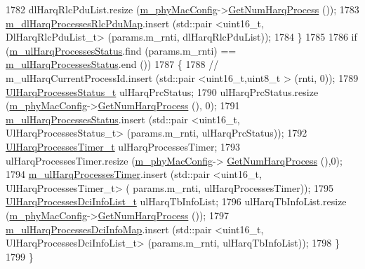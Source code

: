 \begin{DoxyCode}
1782         dlHarqRlcPduList.resize (\hyperlink{classns3_1_1MmWaveMacScheduler_a24d7af4971d2e500fe543cefbafa2fd9}{m\_phyMacConfig}->\hyperlink{classns3_1_1MmWavePhyMacCommon_a40773d84172ebeb5aff125f56ebcc5ac}{GetNumHarqProcess} ());
1783         \hyperlink{classns3_1_1MmWaveFlexTtiMacScheduler_a7b37cf0428128dbfe578cd3c5d3ffbe9}{m\_dlHarqProcessesRlcPduMap}.insert (std::pair <uint16\_t,
       DlHarqRlcPduList\_t> (params.m\_rnti, dlHarqRlcPduList));
1784   \}
1785 
1786   \textcolor{keywordflow}{if} (\hyperlink{classns3_1_1MmWaveFlexTtiMacScheduler_af728e6ddeaaf55536ca842682904d64a}{m\_ulHarqProcessesStatus}.find (params.m\_rnti) == 
      \hyperlink{classns3_1_1MmWaveFlexTtiMacScheduler_af728e6ddeaaf55536ca842682904d64a}{m\_ulHarqProcessesStatus}.end ())
1787   \{
1788         \textcolor{comment}{//                              m\_ulHarqCurrentProcessId.insert (std::pair <uint16\_t,uint8\_t >
       (rnti, 0));}
1789         \hyperlink{classns3_1_1MmWaveFlexTtiMacScheduler_ad0ab2d61606f26e8ceaf67ee115d20f0}{UlHarqProcessesStatus\_t} ulHarqPrcStatus;
1790         ulHarqPrcStatus.resize (\hyperlink{classns3_1_1MmWaveMacScheduler_a24d7af4971d2e500fe543cefbafa2fd9}{m\_phyMacConfig}->\hyperlink{classns3_1_1MmWavePhyMacCommon_a40773d84172ebeb5aff125f56ebcc5ac}{GetNumHarqProcess} (), 0);
1791         \hyperlink{classns3_1_1MmWaveFlexTtiMacScheduler_af728e6ddeaaf55536ca842682904d64a}{m\_ulHarqProcessesStatus}.insert (std::pair <uint16\_t,
       UlHarqProcessesStatus\_t> (params.m\_rnti, ulHarqPrcStatus));
1792         \hyperlink{classns3_1_1MmWaveFlexTtiMacScheduler_a87460d77cb0a37a358ca8db3149222bf}{UlHarqProcessesTimer\_t} ulHarqProcessesTimer;
1793         ulHarqProcessesTimer.resize (\hyperlink{classns3_1_1MmWaveMacScheduler_a24d7af4971d2e500fe543cefbafa2fd9}{m\_phyMacConfig}->
      \hyperlink{classns3_1_1MmWavePhyMacCommon_a40773d84172ebeb5aff125f56ebcc5ac}{GetNumHarqProcess} (),0);
1794         \hyperlink{classns3_1_1MmWaveFlexTtiMacScheduler_a27a2652523d0e61fa7da08a7d43b84a1}{m\_ulHarqProcessesTimer}.insert (std::pair <uint16\_t, UlHarqProcessesTimer\_t> (
      params.m\_rnti, ulHarqProcessesTimer));
1795         \hyperlink{classns3_1_1MmWaveFlexTtiMacScheduler_a74be63957bd21643f909fc2cb7867c04}{UlHarqProcessesDciInfoList\_t} ulHarqTbInfoList;
1796         ulHarqTbInfoList.resize (\hyperlink{classns3_1_1MmWaveMacScheduler_a24d7af4971d2e500fe543cefbafa2fd9}{m\_phyMacConfig}->\hyperlink{classns3_1_1MmWavePhyMacCommon_a40773d84172ebeb5aff125f56ebcc5ac}{GetNumHarqProcess} ());
1797         \hyperlink{classns3_1_1MmWaveFlexTtiMacScheduler_ad18cf8a17f05488fc679bd891175864f}{m\_ulHarqProcessesDciInfoMap}.insert (std::pair <uint16\_t,
       UlHarqProcessesDciInfoList\_t> (params.m\_rnti, ulHarqTbInfoList));
1798   \}
1799 \}
\end{DoxyCode}


